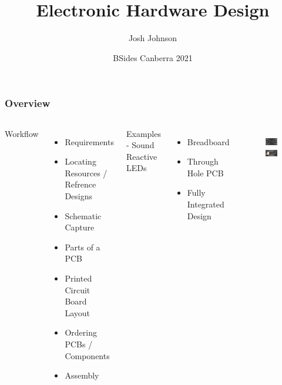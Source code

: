 \documentclass[aspectratio=169, t]{beamer}
\title[Electronic Hardware Design]{Electronic Hardware Design}
\author{Josh Johnson}
\date{BSides Canberra 2021}
\begin{document}
\begin{frame}
\titlepage
\end{frame}

\begin{frame}
\frametitle{Overview}
\begin{columns}
		Workflow
		\begin{itemize}
			\item Requirements
			\item Locating Resources / Refrence Designs
			\item Schematic Capture
			\item Parts of a PCB
			\item Printed Circuit Board Layout
			\item Ordering PCBs / Components
			\item Assembly
		\end{itemize}
		Examples - Sound Reactive LEDs
		\begin{itemize}
			\item Breadboard
			\item Through Hole PCB
			\item Fully Integrated Design
		\end{itemize}
	
		\vspace{-8mm}
		\begin{figure}
			\includegraphics[width=0.9\linewidth]{images/bowtie-front.JPG}
			\includegraphics[width=0.9\linewidth]{images/bowtie-back.JPG}
		\end{figure}
\end{columns}
\end{frame}
\end{document}
